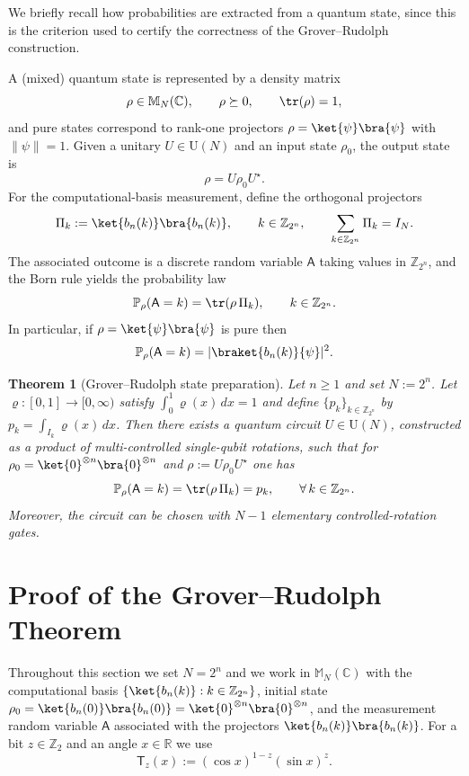 \documentclass{article}
\newtheorem{theorem}{Theorem}[section]
\newcommand{\rA}{\mathsf{A}}
\numberwithin{equation}{section}
\begin{document}
We briefly recall how probabilities are extracted from a quantum state, since this is the
criterion used to certify the correctness of the Grover--Rudolph construction.

A (mixed) quantum state is represented by a density matrix
\[
\rho \in \mathbb{M}_N(\mathbb{C}),\qquad \rho\succeq 0,\qquad \tr(\rho)=1,
\]
and pure states correspond to rank-one projectors $\rho=\ket{\psi}\bra{\psi}$ with $\|\psi\|=1$.
Given a unitary $U\in\mathrm{U}(N)$ and an input state $\rho_0$, the output state is
\[
\rho = U\rho_0 U^\star.
\]
For the computational-basis measurement, define the orthogonal projectors
\[
\Pi_k := \ket{b_n(k)}\bra{b_n(k)},\qquad k\in\mathbb{Z}_{2^n},
\qquad
\sum_{k\in\mathbb{Z}_{2^n}}\Pi_k = I_N.
\]
The associated outcome is a discrete random variable $\rA$ taking values in $\mathbb{Z}_{2^n}$, and
the Born rule yields the probability law
\begin{equation}\label{eq:born}
\mathbb{P}_{\rho}(\rA=k) = \tr(\rho\,\Pi_k),\qquad k\in\mathbb{Z}_{2^n}.
\end{equation}
In particular, if $\rho=\ket{\psi}\bra{\psi}$ is pure then
\[
\mathbb{P}_{\rho}(\rA=k) = |\braket{b_n(k)}{\psi}|^2.
\]

\begin{theorem}[Grover--Rudolph state preparation]\label{theorem:Grover-Rudolph}
Let $n\ge 1$ and set $N:=2^n$. Let $\varrho:[0,1]\to[0,\infty)$ satisfy $\int_0^1\varrho(x)\,dx=1$
and define $\{p_k\}_{k\in\mathbb{Z}_{2^n}}$ by $p_k=\int_{I_k}\varrho(x)\,dx$.
Then there exists a quantum circuit $U\in\mathrm{U}(N)$, constructed as a product of
multi-controlled single-qubit rotations, such that for $\rho_0=\ket{0}^{\otimes n}\bra{0}^{\otimes n}$
and $\rho:=U\rho_0U^\star$ one has
\[
\mathbb{P}_{\rho}(\rA=k)=\tr(\rho\,\Pi_k)=p_k,\qquad \forall\,k\in\mathbb{Z}_{2^n}.
\]
Moreover, the circuit can be chosen with $N-1$ elementary controlled-rotation gates.
\end{theorem}


\section{Proof of the Grover--Rudolph Theorem}\label{sec:proof_GR}

Throughout this section we set $N=2^n$ and we work in $\mathbb{M}_N(\mathbb{C})$ with the
computational basis $\{\ket{b_n(k)}:k\in\mathbb{Z}_{2^n}\}$, initial state
$\rho_0=\ket{b_n(0)}\bra{b_n(0)}=\ket{0}^{\otimes n}\bra{0}^{\otimes n}$, and the measurement
random variable $\rA$ associated with the projectors $\ket{b_n(k)}\bra{b_n(k)}$.
For a bit $z\in\mathbb{Z}_2$ and an angle $x\in\mathbb{R}$ we use
\[
\mathsf{T}_z(x) := (\cos x)^{1-z}(\sin x)^z .
\]
\end{document}
